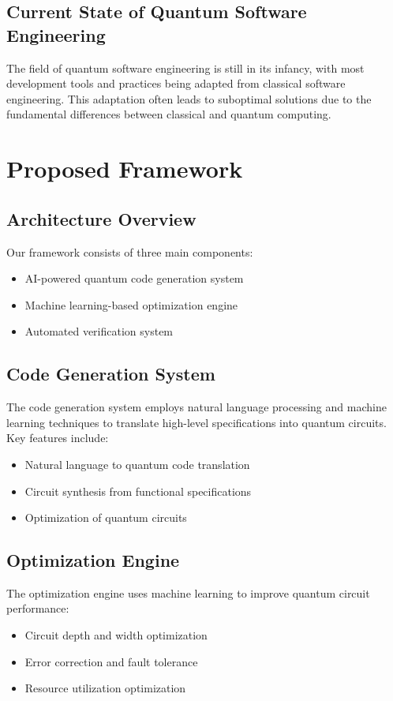 \documentclass[10pt,twocolumn]{article}
\begin{document}
\subsection{Current State of Quantum Software Engineering}
The field of quantum software engineering is still in its infancy, with most development tools and practices being adapted from classical software engineering. This adaptation often leads to suboptimal solutions due to the fundamental differences between classical and quantum computing.

\section{Proposed Framework}
\subsection{Architecture Overview}
Our framework consists of three main components:
\begin{itemize}[leftmargin=*]
    \item AI-powered quantum code generation system
    \item Machine learning-based optimization engine
    \item Automated verification system
\end{itemize}

\subsection{Code Generation System}
The code generation system employs natural language processing and machine learning techniques to translate high-level specifications into quantum circuits. Key features include:
\begin{itemize}[leftmargin=*]
    \item Natural language to quantum code translation
    \item Circuit synthesis from functional specifications
    \item Optimization of quantum circuits
\end{itemize}

\subsection{Optimization Engine}
The optimization engine uses machine learning to improve quantum circuit performance:
\begin{itemize}[leftmargin=*]
    \item Circuit depth and width optimization
    \item Error correction and fault tolerance
    \item Resource utilization optimization
\end{itemize}
\end{document}
